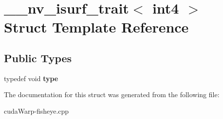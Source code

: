 \hypertarget{struct____nv__isurf__trait_3_01int4_01_4}{}\section{\+\_\+\+\_\+nv\+\_\+isurf\+\_\+trait$<$ int4 $>$ Struct Template Reference}
\label{struct____nv__isurf__trait_3_01int4_01_4}
\subsection*{Public Types}
\begin{DoxyCompactItemize}
\item 
typedef void {\bfseries type}\hypertarget{struct____nv__isurf__trait_3_01int4_01_4_a4eaec5dd67eb217d22ac23a388a26e10}{}\label{struct____nv__isurf__trait_3_01int4_01_4_a4eaec5dd67eb217d22ac23a388a26e10}

\end{DoxyCompactItemize}


The documentation for this struct was generated from the following file\+:\begin{DoxyCompactItemize}
\item 
cuda\+Warp-\/fisheye.\+cpp\end{DoxyCompactItemize}
